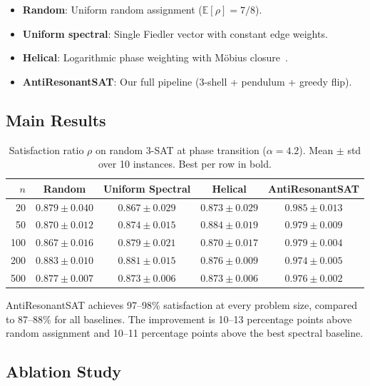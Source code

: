 \documentclass[11pt,a4paper]{article}
\begin{document}
\begin{itemize}[leftmargin=*]
\item \textbf{Random}: Uniform random assignment ($\mathbb{E}[\rho] = 7/8$).
\item \textbf{Uniform spectral}: Single Fiedler vector with constant edge weights.
\item \textbf{Helical}: Logarithmic phase weighting with M\"obius closure~\cite{knopp2025helical}.
\item \textbf{AntiResonantSAT}: Our full pipeline (3-shell + pendulum + greedy flip).
\end{itemize}

\subsection{Main Results}

\begin{table}[h]
\centering
\caption{Satisfaction ratio $\rho$ on random 3-SAT at phase transition ($\alpha = 4.2$).
Mean $\pm$ std over 10 instances. Best per row in bold.}
\label{tab:main}
\begin{tabular}{@{}rcccc@{}}
\toprule
$n$ & Random & Uniform Spectral & Helical & \textbf{AntiResonantSAT} \\
\midrule
20  & $0.879 \pm 0.040$ & $0.867 \pm 0.029$ & $0.873 \pm 0.029$ & $\mathbf{0.985 \pm 0.013}$ \\
50  & $0.870 \pm 0.012$ & $0.874 \pm 0.015$ & $0.884 \pm 0.019$ & $\mathbf{0.979 \pm 0.009}$ \\
100 & $0.867 \pm 0.016$ & $0.879 \pm 0.021$ & $0.870 \pm 0.017$ & $\mathbf{0.979 \pm 0.004}$ \\
200 & $0.883 \pm 0.010$ & $0.881 \pm 0.015$ & $0.876 \pm 0.009$ & $\mathbf{0.974 \pm 0.005}$ \\
500 & $0.877 \pm 0.007$ & $0.873 \pm 0.006$ & $0.873 \pm 0.006$ & $\mathbf{0.976 \pm 0.002}$ \\
\bottomrule
\end{tabular}
\end{table}

AntiResonantSAT achieves 97--98\% satisfaction at every problem size,
compared to 87--88\% for all baselines. The improvement is
10--13 percentage points above random assignment and 10--11 percentage
points above the best spectral baseline.

\subsection{Ablation Study}
\end{document}
